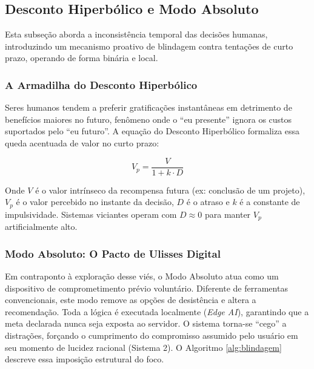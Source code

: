 \documentclass{sbc2023}
\begin{document}
\subsection{Desconto Hiperbólico e Modo Absoluto} \label{sec:abs_mode}

Esta subseção aborda a inconsistência temporal das decisões humanas, introduzindo um mecanismo proativo de blindagem contra tentações de curto prazo, operando de forma binária e local.

\subsubsection{A Armadilha do Desconto Hiperbólico} \label{sec:abs_math}

Seres humanos tendem a preferir gratificações instantâneas em detrimento de benefícios maiores no futuro, fenômeno onde o ``eu presente'' ignora os custos suportados pelo ``eu futuro''. A equação do Desconto Hiperbólico formaliza essa queda acentuada de valor no curto prazo:

\begin{equation} \label{eq:hiperbolic}
    V_p = \frac{V}{1 + k \cdot D}
\end{equation}

Onde $V$ é o valor intrínseco da recompensa futura (ex: conclusão de um projeto), $V_p$ é o valor percebido no instante da decisão, $D$ é o atraso e $k$ é a constante de impulsividade. Sistemas viciantes operam com $D \approx 0$ para manter $V_p$ artificialmente alto.

\subsubsection{Modo Absoluto: O Pacto de Ulisses Digital} \label{sec:abs_concept}

Em contraponto à exploração desse viés, o Modo Absoluto atua como um dispositivo de comprometimento prévio voluntário. Diferente de ferramentas convencionais, este modo remove as opções de desistência e altera a recomendação. Toda a lógica é executada localmente (\textit{Edge AI}), garantindo que a meta declarada nunca seja exposta ao servidor. O sistema torna-se ``cego'' a distrações, forçando o cumprimento do compromisso assumido pelo usuário em seu momento de lucidez racional (Sistema 2). O Algoritmo \ref{alg:blindagem} descreve essa imposição estrutural do foco.

\begin{algorithm}[h]
\caption{Protocolo de Blindagem Cognitiva (Modo Absoluto)}
\label{alg:blindagem}
\end{algorithm}
\end{document}
